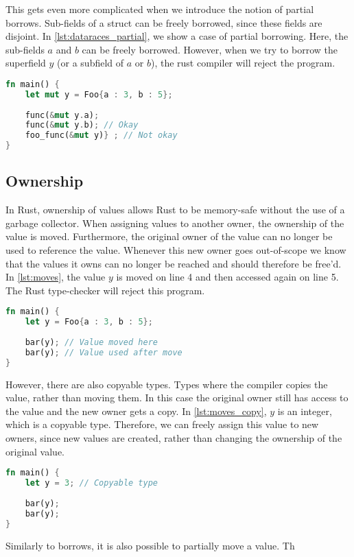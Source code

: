 This gets even more complicated when we introduce the notion of partial borrows. Sub-fields of a struct can be freely borrowed, since these fields are disjoint. In \autoref{lst:dataraces_partial}, we show a case of partial borrowing. Here, the sub-fields $a$ and $b$ can be freely borrowed. However, when we try to borrow the superfield $y$ (or a subfield of $a$ or $b$), the rust compiler will reject the program.
 \begin{lstlisting}[language=rust, showstringspaces=false, escapechar=~, label={lst:dataraces_partial}, caption={Example of partial borrows}]
fn main() { 
    let mut y = Foo{a : 3, b : 5};
    
    func(&mut y.a);
    func(&mut y.b); // Okay
    foo_func(&mut y)} ; // Not okay 
}
\end{lstlisting}

\subsection{Ownership}
In Rust, ownership of values allows Rust to be memory-safe without the use of a garbage collector\cite{rust_book_ownership}. When assigning values to another owner, the ownership of the value is moved. Furthermore, the original owner of the value can no longer be used to reference the value. 
Whenever this new owner goes out-of-scope we know that the values it owns can no longer be reached and should therefore be free'd. 
In \autoref{lst:moves}, the value $y$ is moved on line 4 and then accessed again on line 5. The Rust type-checker will reject this program. 
    
\begin{lstlisting}[language=rust, showstringspaces=false, escapechar=~, label={lst:moves}, caption={Example of moving variables}]
fn main() { 
    let y = Foo{a : 3, b : 5};
    
    bar(y); // Value moved here
    bar(y); // Value used after move
}
\end{lstlisting}

However, there are also copyable types. Types where the compiler copies the value, rather than moving them. In this case the original owner still has access to the value and the new owner gets a copy.
In \autoref{lst:moves_copy}, $y$ is an integer, which is a copyable type. Therefore, we can freely assign this value to new owners, since new values are created, rather than changing the ownership of the original value. 

\begin{lstlisting}[language=rust, showstringspaces=false, escapechar=~, label={lst:moves_copy}, caption={Example of copyable type}]
fn main() { 
    let y = 3; // Copyable type
    
    bar(y);
    bar(y); 
}
\end{lstlisting}

Similarly to borrows, it is also possible to partially move a value. Th
